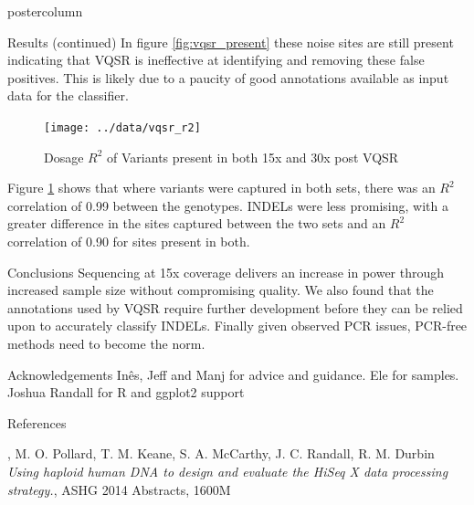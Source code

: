 \documentclass[final,xcolor=table]{beamer}
\begin{document}
\begin{frame}{}
\begin{columns}[t]
\begin{column}{.49\textwidth}
\begin{beamercolorbox}[center,wd=\textwidth]{postercolumn}
\begin{minipage}[T]{.95\textwidth}
\begin{block}{Results (continued)}
                {In figure \ref{fig:vqsr_present} these noise sites are still present indicating that VQSR is ineffective at identifying and removing these false positives. This is likely due to a paucity of good annotations available as input data for the classifier.}

                \begin{figure}
                \texttt{[image: ../data/vqsr\_r2]}
                \caption{Dosage $R^2$ of Variants present in both 15x and 30x post VQSR}
                \label{fig:r2}
                \end{figure}

                Figure \ref{fig:r2} shows that where variants were captured in both sets, there was an $R^2$ correlation of 0.99 between the genotypes. INDELs were less promising, with a greater difference in the sites captured between the two sets and an $R^2$ correlation of 0.90 for sites present in both.

            \end{block}
            \begin{block}{Conclusions}
                Sequencing at 15x coverage delivers an increase in power through increased sample size without compromising quality. We also found that the annotations used by VQSR require further development before they can be relied upon to accurately classify INDELs. Finally given observed PCR issues, PCR-free methods need to become the norm.
            \end{block}
            \begin{block}{Acknowledgements}
                Inês, Jeff and Manj for advice and guidance. Ele for samples. Joshua Randall for R and ggplot2 support
            \end{block}
            \begin{block}{References}
\begin{thebibliography}{1}

,
M. O. Pollard, T. M. Keane, S. A. McCarthy, J. C. Randall, R. M. Durbin
\emph{Using haploid human DNA to design and evaluate the HiSeq X data processing strategy.},
ASHG 2014 Abstracts,
1600M
\end{thebibliography}


\end{block}
\end{minipage}
\end{beamercolorbox}
\end{column}
\end{columns}
\end{frame}
\end{document}
